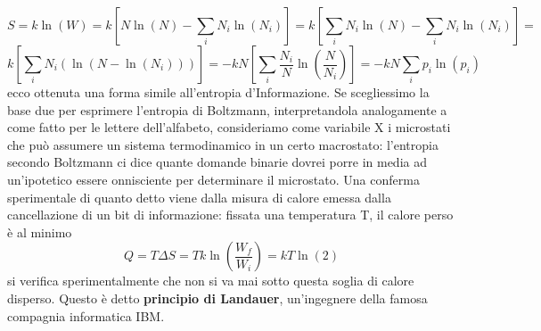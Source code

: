 \documentclass[
10pt, %
a4paper, %
oneside, %
headinclude,footinclude, %
BCOR5mm, %
]{scrartcl}
\begin{document}
\[S = k\ln(W)=k[N\ln(N)-\sum_iN_i\ln(N_i)]=k\left[\sum_iN_i\ln(N)-\sum_iN_i\ln(N_i)\right]=\]
\[k\left[\sum_iN_i(\ln(N-\ln(N_i)))\right]=-kN\left[\sum_i\frac{N_i}{N}\ln\left(\frac{N}{N_i}\right)\right] =-kN\sum_ip_i\ln(p_i)\]
ecco ottenuta una forma simile all'entropia d'Informazione. Se scegliessimo la base due per esprimere l'entropia di Boltzmann, interpretandola analogamente a come fatto per le lettere dell'alfabeto, consideriamo come variabile X i microstati che può assumere un sistema termodinamico in un certo macrostato: l'entropia secondo Boltzmann ci dice quante domande binarie dovrei porre in media ad un'ipotetico essere onnisciente per determinare il microstato. Una conferma sperimentale di quanto detto viene dalla misura di calore emessa dalla cancellazione di un bit di informazione: fissata una temperatura T, il calore perso è al minimo 
\[Q=T\Delta S=Tk\ln(\frac{W_f}{W_i})=kT\ln(2)  \]
si verifica sperimentalmente che non si va mai sotto questa soglia di calore disperso. Questo è detto \textbf{principio di Landauer}, un'ingegnere della famosa compagnia informatica IBM.
\appendix
\end{document}
